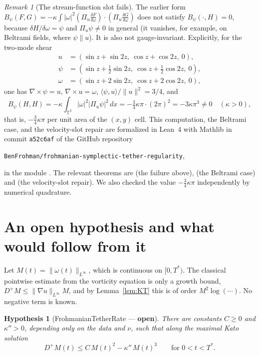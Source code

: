 \documentclass[11pt,reqno]{amsart}
\newtheorem{hypothesis}[lemma]{Hypothesis}
\theoremstyle{definition}
\theoremstyle{remark}
\newtheorem{remark}[lemma]{Remark}
\newcommand{\T}{\mathbb{T}^3}
\newcommand{\norm}[1]{\lVert #1\rVert}
\newcommand{\abs}[1]{\lvert #1\rvert}
\newcommand{\ip}[2]{\langle #1,#2\rangle}
\newcommand{\curl}{\nabla\times}
\newcommand{\Pu}{\Pi_u}
\begin{document}
\begin{remark}[The stream-function slot fails]\label{rem:psislot}
The earlier form $B_\psi(F,G)=-\kappa\int\abs{\omega}^2(\Pu\frac{\delta F}{\delta\omega})\cdot(\Pu\frac{\delta G}{\delta\omega})$ does not satisfy $B_\psi(\cdot,H)=0$, because $\delta H/\delta\omega=\psi$ and $\Pu\psi\neq0$ in general (it vanishes, for example, on Beltrami fields, where $\psi\parallel u$). It is also not gauge-invariant. Explicitly, for the two-mode shear
\begin{align*}
u&=(\sin z+\sin2z,\ \cos z+\cos2z,\ 0),\\
\psi&=(\sin z+\tfrac12\sin2z,\ \cos z+\tfrac12\cos2z,\ 0),\\
\omega&=(\sin z+2\sin2z,\ \cos z+2\cos2z,\ 0),
\end{align*}
one has $\curl\psi=u$, $\curl u=\omega$, $\ip{\psi}{u}/\norm{u}^2=3/4$, and
\[
B_\psi(H,H)=-\kappa\int_{\T}\abs{\omega}^2\abs{\Pu\psi}^2\,dx=-\tfrac34\kappa\pi\cdot(2\pi)^2=-3\kappa\pi^3\neq0\quad(\kappa>0),
\]
that is, $-\frac34\kappa\pi$ per unit area of the $(x,y)$ cell. This computation, the Beltrami case, and the velocity-slot repair are formalized in Lean~4 with Mathlib in commit \texttt{a52c6af} of the GitHub repository
\begin{center}
\texttt{BenFrohman/frohmanian-symplectic-tether-regularity},
\end{center}
in the module . The relevant theorems are  (the failure above),  (the Beltrami case) and  (the velocity-slot repair). We also checked the value $-\frac34\kappa\pi$ independently by numerical quadrature.
\end{remark}

\section{An open hypothesis and what would follow from it}\label{sec:open}

Let $M(t)=\norm{\omega(t)}_{L^\infty}$, which is continuous on $[0,T^*)$. The classical pointwise estimate from the vorticity equation is only a growth bound, $D^+M\le\norm{\nabla u}_{L^\infty}M$, and by Lemma~\ref{lem:KT} this is of order $M^2\log(\cdots)$. No negative term is known.

\begin{hypothesis}[FrohmanianTetherRate --- \textbf{open}]\label{hyp:rate}
There are constants $C\ge0$ and $\kappa''>0$, depending only on the data and $\nu$, such that along the maximal Kato solution
\[
D^+M(t)\le C\,M(t)^2-\kappa''\,M(t)^3\qquad\text{for }0<t<T^* .
\]
\end{hypothesis}
\end{document}
